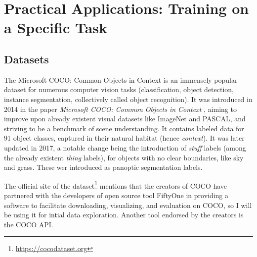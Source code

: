 \chapter{Practical Applications: Training on a Specific Task}

\section{Datasets}


The Microsoft COCO: Common Objects in Context is an immensely popular dataset for numerous computer vision tasks (classification, object detection, instance segmentation, collectively called object recognition). It was introduced in 2014 in the paper \textit{Microsoft COCO: Common Objects in Context} \cite{Coco}, aiming to improve upon already existent visual datasets like ImageNet and PASCAL, and striving to be a benchmark of scene understanding. It contains labeled data for 91 object classes, captured in their natural habitat (hence \textit{context}). It was later updated in 2017, a notable change being the introduction of \textit{stuff} labels (among the already existent \textit{thing} labels), for objects with no clear boundaries, like sky and grass. These wer introduced as panoptic segmentation labels.

The official site of the dataset\footnote{\url{https://cocodataset.org}} mentions that the creators of COCO have partnered with the developers of open source tool FiftyOne in providing a software to facilitate downloading, visualizing, and evaluation on COCO, so I will be using it for intial data exploration. Another tool endorsed by the creators is the COCO API.



